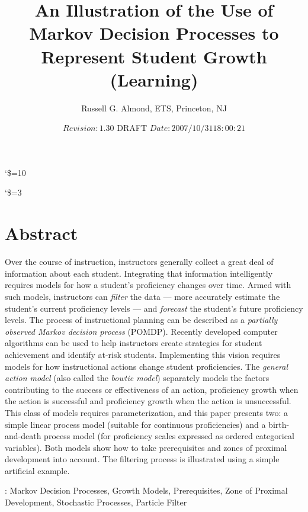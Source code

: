 \documentclass[12pt]{RR-article}
\begin{document}
\title{\large{\bf An Illustration of the Use of Markov Decision
    Processes to Represent Student Growth (Learning)}}
\author{Russell G. Almond, ETS, Princeton, NJ}
\catcode`\$=10 %
\date{$Revision: 1.30 $ \quad DRAFT $Date: 2007/10/31 18:00:21 $}
\catcode`\$=3 %
\vspace{40cm} \maketitle \pagestyle{plain} \thispagestyle{empty}
\newpage
\setlength{\topmargin}{0in}

\section*{Abstract}

Over the course of instruction, instructors generally collect
a great deal of information about each student.  Integrating that
information intelligently requires models for how a student's
proficiency changes over time.  Armed with such models, instructors can
\textit{filter\/} the data --- more accurately estimate the student's
current proficiency levels --- and \textit{forecast\/} the student's
future proficiency levels.  The process of instructional planning can
be described as a \textit{partially observed Markov decision
process\/} (POMDP).  Recently developed computer algorithms can be
used to help instructors create strategies for student achievement and
identify at-risk students.  Implementing this vision requires models
for how instructional actions change student proficiencies.  The
\textit{general action model} (also called the \textit{bowtie model})
separately models the factors contributing to the success or
effectiveness of an action, proficiency growth when the action is
successful and proficiency growth when the action is unsuccessful.
This class of models requires parameterization, and this paper
presents two:  a simple linear process model (suitable for
continuous proficiencies) and a birth-and-death process
model (for proficiency scales expressed as ordered categorical
variables).  Both models show how to take prerequisites and zones of
proximal development into account.  The filtering process is
illustrated using a simple artificial example.

\vspace{1cm} : Markov Decision Processes, Growth
Models, Prerequisites, Zone of Proximal Development, Stochastic
Processes, Particle Filter
\end{document}
